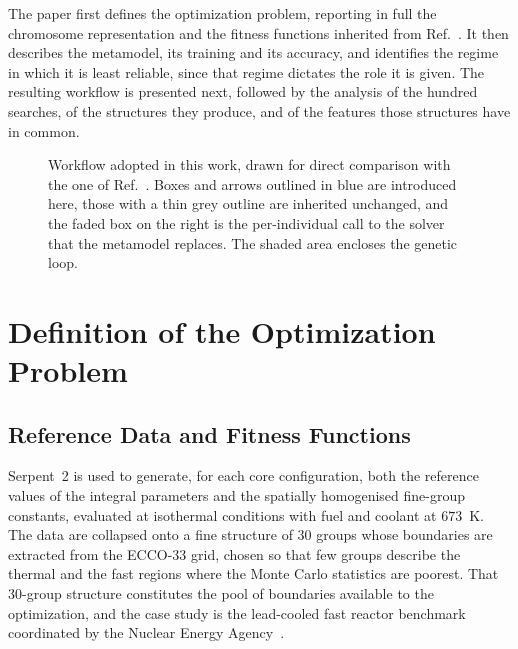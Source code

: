 \documentclass{style/nseJournal}
\begin{document}
The paper first defines the optimization problem, reporting in full the
chromosome representation and the fitness functions inherited from
Ref.~\cite{prevMulti}. It then describes the metamodel, its training and its
accuracy, and identifies the regime in which it is least reliable, since that
regime dictates the role it is given. The resulting workflow is presented next,
followed by the analysis of the hundred searches, of the structures they
produce, and of the features those structures have in common.

\begin{figure}[htbp]
  \centering
  \resizebox{140mm}{!}{}
  \caption{Workflow adopted in this work, drawn for direct comparison with the
  one of Ref.~\cite{prevMulti}. Boxes and arrows outlined in blue are introduced
  here, those with a thin grey outline are inherited unchanged, and the faded box
  on the right is the per-individual call to the solver that the metamodel
  replaces. The shaded area encloses the genetic loop.}
  \label{fig:flow}
\end{figure}


\section{Definition of the Optimization Problem}

\subsection{Reference Data and Fitness Functions}

Serpent~2 is used to generate, for each core configuration, both the reference
values of the integral parameters and the spatially homogenised fine-group
constants, evaluated at isothermal conditions with fuel and coolant at $673$~K.
The data are collapsed onto a fine structure of 30 groups whose boundaries are
extracted from the ECCO-33 grid, chosen so that few groups describe the thermal
and the fast regions where the Monte Carlo statistics are poorest. That
30-group structure constitutes the pool of boundaries available to the
optimization, and the case study is the lead-cooled fast reactor benchmark
coordinated by the Nuclear Energy Agency~\cite{neaBench}.
\end{document}
